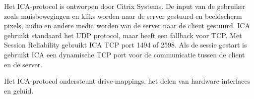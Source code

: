 Het ICA-protocol is ontworpen door Citrix Systems. De input van de gebruiker zoals muisbewegingen en kliks worden naar de server gestuurd en beeldscherm pixels, audio en andere media worden van de server naar de client gestuurd. ICA gebruikt standaard het UDP protocol, maar heeft een fallback voor TCP. Met Session Reliability gebruikt ICA TCP port 1494 of 2598. Als de sessie gestart is gebruikt ICA een dynamische TCP port voor de communicatie tussen de client en de server.

Het ICA-protocol ondersteunt drive-mappings, het delen van hardware-interfaces en geluid.
